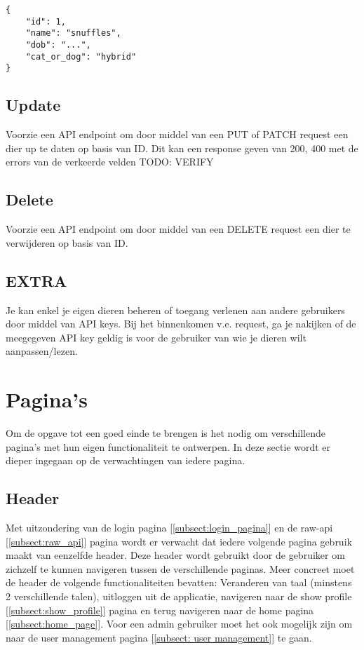 \documentclass{article}
\begin{document}
\begin{verbatim}
{
    "id": 1,
    "name": "snuffles",
    "dob": "...",
    "cat_or_dog": "hybrid"
}
\end{verbatim}


\subsection{Update}
Voorzie een API endpoint om door middel van een PUT of PATCH request een dier up te daten op basis van ID. Dit kan een response geven van 200, 400 met de errors van de verkeerde velden TODO: VERIFY

\subsection{Delete}
Voorzie een API endpoint om door middel van een DELETE request een dier te verwijderen op basis van ID.

\subsection{EXTRA}
Je kan enkel je eigen dieren beheren of toegang verlenen aan andere gebruikers door middel van API keys. Bij het binnenkomen v.e. request, ga je nakijken of de meegegeven API key geldig is voor de gebruiker van wie je dieren wilt aanpassen/lezen.

\section{Pagina's}
Om de opgave tot een goed einde te brengen is het nodig om verschillende pagina's met hun eigen functionaliteit te ontwerpen. In deze sectie wordt er dieper ingegaan op de verwachtingen van iedere pagina.

\subsection{Header}
Met uitzondering van de login pagina [\ref{subsect:login_pagina}] en de raw-api [\ref{subsect:raw_api}] pagina wordt er verwacht dat iedere volgende pagina gebruik maakt van eenzelfde header. Deze header wordt gebruikt door de gebruiker om zichzelf te kunnen navigeren tussen de verschillende paginas. Meer concreet moet de header de volgende functionaliteiten bevatten: Veranderen van taal (minstens 2 verschillende talen), uitloggen uit de applicatie,  navigeren naar de show profile [\ref{subsect:show_profile}] pagina en terug navigeren naar de home pagina [\ref{subsect:home_page}]. Voor een admin gebruiker moet het ook mogelijk zijn om naar de user management pagina [\ref{subsect: user management}] te gaan.
\end{document}
